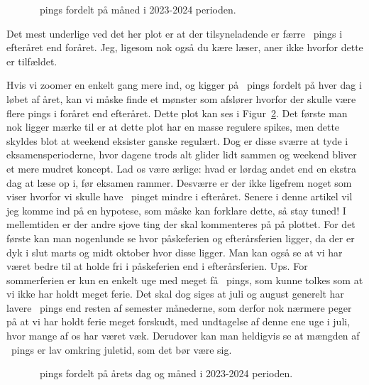 \begin{article}
\begin{figure}[H]
	\centering
	\resizebox{\columnwidth}{!}{}
	\vspace{-20pt}
	\caption{\protect\coffee\ pings fordelt på måned i 2023-2024 perioden.}
	\label{fig:month_analysis_2023-2024}
\end{figure}

Det mest underlige ved det her plot er at der tilsyneladende er færre \coffee\ pings i efteråret end foråret. Jeg, ligesom nok også du kære læser, aner ikke hvorfor dette er tilfældet.

Hvis vi zoomer en enkelt gang mere ind, og kigger på \coffee\ pings fordelt på hver dag i løbet af året, kan vi måske finde et mønster som afslører hvorfor der skulle være flere pings i foråret end efteråret. Dette plot kan ses i Figur~\ref{fig:year_analysis_2023-2024}. Det første man nok ligger mærke til er at dette plot har en masse regulere spikes, men dette skyldes blot at weekend eksister ganske regulært.
Dog er disse sværre at tyde i eksamensperioderne, hvor dagene trods alt glider lidt sammen og weekend bliver et mere mudret koncept. Lad os være ærlige: hvad er lørdag andet end en ekstra dag at læse op i, før eksamen rammer.
Desværre er der ikke ligefrem noget som viser hvorfor vi skulle have \coffee\ pinget mindre i efteråret. Senere i denne artikel vil jeg komme ind på en hypotese, som måske kan forklare dette, så stay tuned! I mellemtiden er der andre sjove ting der skal kommenteres på på plottet.
For det første kan man nogenlunde se hvor påskeferien og efterårsferien ligger, da der er dyk i slut marts og midt oktober hvor disse ligger. Man kan også se at vi har været bedre til at holde fri i påskeferien end i efterårsferien. Ups.
For sommerferien er kun en enkelt uge med meget få \coffee\ pings, som kunne tolkes som at vi ikke har holdt meget ferie. Det skal dog siges at juli og august generelt har lavere \coffee\ pings end resten af semester månederne, som derfor nok nærmere peger på at vi har holdt ferie meget forskudt, med undtagelse af denne ene uge i juli, hvor mange af os har været væk.
Derudover kan man heldigvis se at mængden af \coffee\ pings er lav omkring juletid, som det bør være sig.

\begin{figure}[t!]
	\centering
	\resizebox{2\columnwidth}{!}{}
	\vspace{-15pt}
	\caption{\protect\coffee\ pings fordelt på årets dag og måned i 2023-2024 perioden.}
	\label{fig:year_analysis_2023-2024}
\end{figure}


\end{article}
